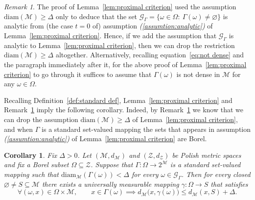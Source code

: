 \documentclass[11pt,reqno]{amsart}
\renewcommand{\le}{\leqslant}
\renewcommand{\ge}{\geqslant}
\newcommand{\diam}{\mathrm{diam}}
\newtheorem{corollary}[theorem]{Corollary}
\theoremstyle{remark}
\newtheorem{remark}[theorem]{Remark}
\newcommand{\MM}{\mathcal{M}}
\renewcommand{\subset}{\subseteq}
\renewcommand{\emptyset}{\varnothing}
\renewcommand{\1}{\mathbf 1}
\newcommand{\ZZ}{\mathcal{Z}}
\newcommand{\cG}{\mathscr{G}}
\begin{document}
\begin{remark}\label{rem:no diameter lower} The proof of Lemma~\ref{lem:proximal criterion}  used the assumption $\diam(\MM)\ge \Delta$ only to deduce that the set $\cG_\Gamma=\{\omega\in \Omega:\ \Gamma(\omega)\neq \emptyset\}$ is analytic from (the case $t=0$ of) assumption {\em(\ref{assumtion:analytic})} of Lemma~\ref{lem:proximal criterion}. Hence, if we add the assumption that $\cG_\Gamma$ is analytic to Lemma~\ref{lem:proximal criterion}, then we can drop the restriction  $\diam(\MM)\ge \Delta$  altogether. Alternatively, recalling equation~\eqref{eq:not dense} and the paragraph immediately after it, for the above proof of Lemma~\ref{lem:proximal criterion} to go through it suffices to assume that $\Gamma(\omega)$ is not dense in $\MM$ for any $\omega\in \Omega$.
\end{remark}

Recalling Definition~\ref{def:standard def}, Lemma~\ref{lem:proximal criterion} and Remark~\ref{rem:no diameter lower} imply the following corollary. Indeed, by Remark~\ref{rem:no diameter lower} we know that we can drop the assumption $\diam(\MM)\ge \Delta$ of Lemma~\ref{lem:proximal criterion}, and when $\Gamma$ is  a standard set-valued mapping the sets that appears in assumption {\em (\ref{assumtion:analytic})} of Lemma~\ref{lem:proximal criterion} are Borel.

\begin{corollary}\label{cor:proximal criterion standard} Fix $\Delta>0$. Let $(\MM,d_\MM)$ and $(\ZZ,d_\ZZ)$ be Polish metric spaces and fix a Borel subset $\Omega\subset \ZZ$. Suppose that  $\Gamma:\Omega\to 2^\MM$ is  a standard set-valued mapping such that $\diam_\MM(\Gamma(\omega))<\Delta$ for every $\omega\in \cG_\Gamma$.  Then for every closed $\emptyset\neq S\subset \MM$ there exists a universally measurable mapping $\gamma:\Omega\to S$ that satisfies
$$
\forall (\omega,x)\in \Omega\times \MM,\qquad x\in \Gamma(\omega)\implies d_\MM\big(x,\gamma(\omega)\big)\le d_\MM(x,S)+\Delta.
$$
\end{corollary}
\end{document}
